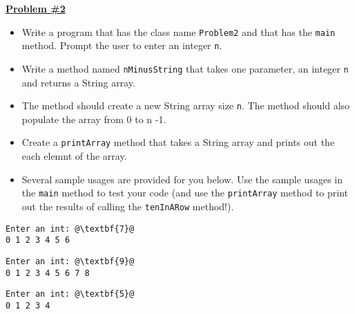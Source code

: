 \documentclass[12pt]{article}
\begin{document}
\vspace*{0.5cm}
\noindent\underline{\textbf{Problem \#2}}
\begin{itemize}
	\item Write a program that has the class name \texttt{Problem2} and that has the \texttt{main} method. Prompt the user to enter an integer \texttt{n}.
	\item Write a method named \texttt{nMinusString} that takes one parameter, an integer \texttt{n} and returns a String array.
	\item The method should create a new String array size \texttt {n}. The method should also populate the array from 0 to n -1.
	\item Create a \texttt{printArray} method that takes a String array and prints out the each elemnt of the array.
	\item Several sample usages are provided for you below. Use the sample usages in the \texttt{main} method to test your code (and use the \texttt{printArray} method to print out the results of calling the \texttt{tenInARow} method!).
\end{itemize}
\begin{center}
\begin{minipage}{3cm}
\begin{lstlisting}[escapechar=@]
Enter an int: @\textbf{7}@
0 1 2 3 4 5 6
\end{lstlisting}
\end{minipage}
\hspace*{.5cm}
\begin{minipage}{3cm}
\begin{lstlisting}[escapechar=@]
Enter an int: @\textbf{9}@
0 1 2 3 4 5 6 7 8
\end{lstlisting}
\end{minipage}
\hspace*{.5cm}
\begin{minipage}{3cm}
\begin{lstlisting}[escapechar=@]
Enter an int: @\textbf{5}@
0 1 2 3 4 
\end{lstlisting}

\end{minipage}\\


\end{center}
\end{document}
